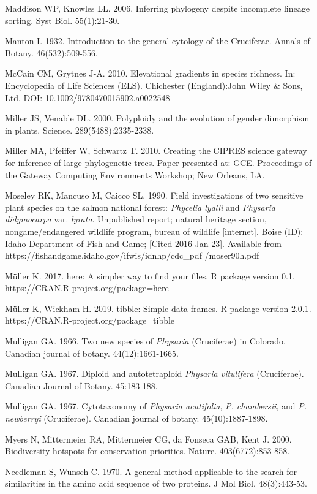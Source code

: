 Maddison WP, Knowles LL. 2006. Inferring phylogeny despite incomplete lineage sorting. Syst Biol. 55(1):21-30.

Manton I. 1932. Introduction to the general cytology of the Cruciferae. Annals of Botany. 46(532):509-556.

McCain CM, Grytnes J-A. 2010. Elevational gradients in species richness. In: Encyclopedia of Life Sciences (ELS). Chichester (England):John Wiley \& Sons, Ltd.  DOI: 10.1002/9780470015902.a0022548

Miller JS, Venable DL. 2000. Polyploidy and the evolution of gender dimorphism in plants. Science. 289(5488):2335-2338.

Miller MA, Pfeiffer W, Schwartz T. 2010. Creating the CIPRES science gateway for inference of large phylogenetic trees. Paper presented at: GCE. Proceedings of the Gateway Computing Environments Workshop; New Orleans, LA.

Moseley RK, Mancuso M, Caicco SL. 1990. Field investigations of two sensitive plant species on the salmon national forest: \textit{Phycelia lyalli} and \textit{Physaria didymocarpa} var. \textit{lyrata}. Unpublished report; natural heritage section, nongame/endangered wildlife program, bureau of wildlife [internet]. Boise (ID): Idaho Department of Fish and Game; [Cited 2016 Jan 23]. Available from https://fishandgame.idaho.gov/ifwis/idnhp/cdc\_pdf /moser90h.pdf

Müller K. 2017. here: A simpler way to find your files. R package version 0.1. https://CRAN.R-project.org/package=here

Müller K, Wickham H. 2019. tibble: Simple data frames. R package version 2.0.1. https://CRAN.R-project.org/package=tibble

Mulligan GA. 1966. Two new species of \textit{Physaria} (Cruciferae) in Colorado. Canadian journal of botany. 44(12):1661-1665.

Mulligan GA. 1967. Diploid and autotetraploid \textit{Physaria vitulifera} (Cruciferae). Canadian Journal of Botany. 45:183-188.

Mulligan GA. 1967. Cytotaxonomy of \textit{Physaria acutifolia}, \textit{P. chambersii}, and \textit{P. newberryi} (Cruciferae). Canadian journal of botany. 45(10):1887-1898.

Myers N, Mittermeier RA, Mittermeier CG, da Fonseca GAB, Kent J. 2000. Biodiversity hotspots for conservation priorities. Nature. 403(6772):853-858.

Needleman S, Wunsch C. 1970. A general method applicable to the search for similarities in the amino acid sequence of two proteins. J Mol Biol. 48(3):443-53.

